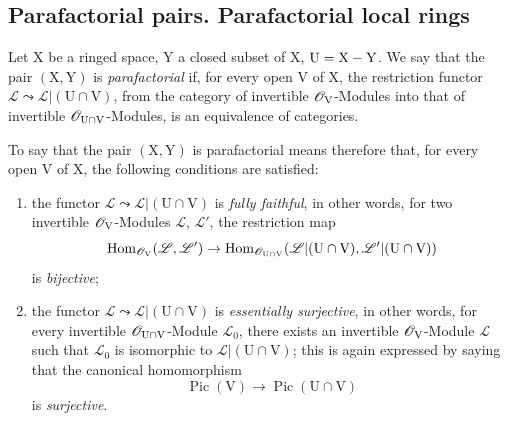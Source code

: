 \subsection{Parafactorial pairs. Parafactorial local rings}
\label{subsection:IV.21.13}
\label{IV.21.13}

\begin{definition}[21.13.1]
\label{IV.21.13.1}
Let $\mathrm{X}$ be a ringed space, $\mathrm{Y}$ a closed subset of $\mathrm{X}$, $\mathrm{U}=\mathrm{X}-\mathrm{Y}$.
We say that the pair $(\mathrm{X},\mathrm{Y})$ is \emph{parafactorial} if, for every open $\mathrm{V}$ of $\mathrm{X}$, the restriction functor $\mathscr{L}\leadsto\mathscr{L}|(\mathrm{U}\cap\mathrm{V})$, from the category of invertible $\mathscr{O}_{\mathrm{V}}$-Modules into that of invertible $\mathscr{O}_{\mathrm{U}\cap\mathrm{V}}$-Modules, is an equivalence of categories.
\end{definition}

To say that the pair $(\mathrm{X},\mathrm{Y})$ is parafactorial means therefore that, for every open $\mathrm{V}$ of $\mathrm{X}$, the following conditions are satisfied:
\begin{enumerate}[label=\arabic*\textsuperscript{o}]
  \item the functor $\mathscr{L}\leadsto\mathscr{L}|(\mathrm{U}\cap\mathrm{V})$ is \emph{fully faithful}, in other words, for two invertible $\mathscr{O}_{\mathrm{V}}$-Modules $\mathscr{L}$, $\mathscr{L}'$, the restriction map
  \[
    \operatorname{Hom}_{\mathscr{O}_{\mathrm{V}}}(\mathscr{L},\mathscr{L}')\to\operatorname{Hom}_{\mathscr{O}_{\mathrm{U}\cap\mathrm{V}}}(\mathscr{L}|(\mathrm{U}\cap\mathrm{V}),\mathscr{L}'|(\mathrm{U}\cap\mathrm{V}))
  \]
  is \emph{bijective};
  \item the functor $\mathscr{L}\leadsto\mathscr{L}|(\mathrm{U}\cap\mathrm{V})$ is \emph{essentially surjective}, in other words, for every invertible $\mathscr{O}_{\mathrm{U}\cap\mathrm{V}}$-Module $\mathscr{L}_0$, there exists an invertible $\mathscr{O}_{\mathrm{V}}$-Module $\mathscr{L}$ such that $\mathscr{L}_0$ is
isomorphic to $\mathscr{L}|(\mathrm{U}\cap\mathrm{V})$; this is again expressed by saying that the canonical homomorphism 
  \[
    \operatorname{Pic}(\mathrm{V})\to\operatorname{Pic}(\mathrm{U}\cap\mathrm{V})
  \]
  is \emph{surjective}.
\end{enumerate}

